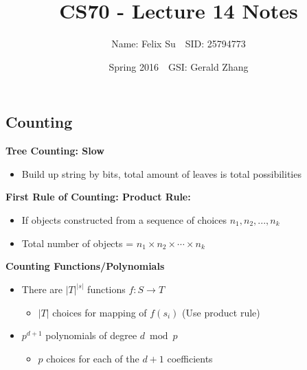 \documentclass{article}\usepackage{amsmath,amssymb,amsthm,tikz,tkz-graph,color,chngpage,soul,hyperref,csquotes,graphicx,floatrow, listings}\newcommand*{\QEDB}{\hfill\ensuremath{\square}}\newtheorem*{prop}{Proposition}\renewcommand{\theenumi}{\alph{enumi}}\usepackage[shortlabels]{enumitem}\usepackage[nobreak=true]{mdframed}\usetikzlibrary{matrix,calc}\MakeOuterQuote{"}\usepackage[margin=0.75in]{geometry} \newtheorem{theorem}{Theorem}\newcommand{\Z}{\mathbb Z}\newcommand{\R}{\mathbb R}\newcommand{\Q}{\mathbb Q}\newcommand{\N}{\mathbb N}
\title{CS70 - Lecture 14 Notes}
\author{Name: Felix Su$\quad$SID: 25794773}
\date{Spring 2016$\quad$GSI: Gerald Zhang}
\begin{document}
\maketitle

\subsection*{Counting}
\textbf{Tree Counting: Slow}
\begin{itemize}
    \item Build up string by bits, total amount of leaves is total possibilities
\end{itemize}
\begin{mdframed}
\textbf{First Rule of Counting: Product Rule:}
\begin{itemize}
    \item If objects constructed from a sequence of choices $n_1, n_2, ..., n_k$
    \item Total number of objects = $n_1 \times n_2 \times \cdots \times n_k$
\end{itemize}
\end{mdframed}

\textbf{Counting Functions/Polynomials}
\begin{itemize}
    \item There are $|T|^{|s|}$ functions $f : S \rightarrow T$
    \begin{itemize}
        \item $|T|$ choices for mapping of $f(s_i)$ (Use product rule)
    \end{itemize}
    \item $p^{d+1}$ polynomials of degree $d \bmod{p}$
    \begin{itemize}
        \item $p$ choices for each of the $d+1$ coefficients
    \end{itemize}
\end{itemize}
\end{document}
